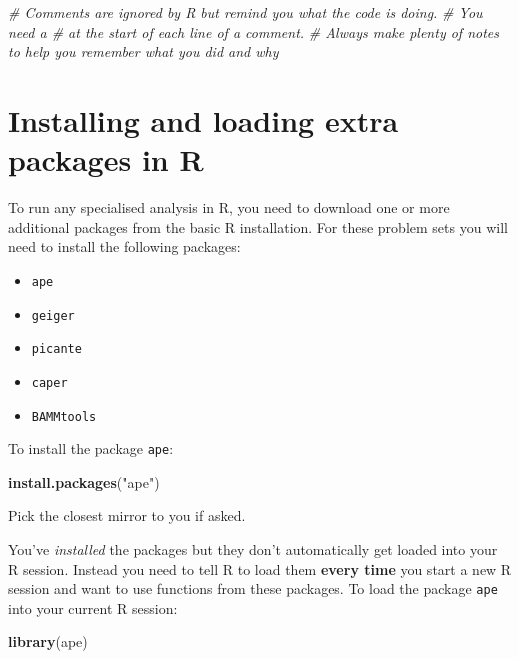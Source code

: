 \documentclass[]{book}
\newenvironment{Shaded}{\begin{snugshade}}{\end{snugshade}}
\newcommand{\KeywordTok}[1]{\textcolor[rgb]{0.13,0.29,0.53}{\textbf{{#1}}}}
\newcommand{\StringTok}[1]{\textcolor[rgb]{0.31,0.60,0.02}{{#1}}}
\newcommand{\CommentTok}[1]{\textcolor[rgb]{0.56,0.35,0.01}{\textit{{#1}}}}
\newcommand{\NormalTok}[1]{{#1}}
\providecommand{\tightlist}{%
  \setlength{\itemsep}{0pt}\setlength{\parskip}{0pt}}
\begin{document}
\begin{Shaded}
\begin{Highlighting}[]
\CommentTok{# Comments are ignored by R but remind you what the code is doing. }
\CommentTok{# You need a # at the start of each line of a comment.}
\CommentTok{# Always make plenty of notes to help you remember what you did and why}
\end{Highlighting}
\end{Shaded}

\section{Installing and loading extra packages in
R}\label{installing-and-loading-extra-packages-in-r}

To run any specialised analysis in R, you need to download one or more
additional packages from the basic R installation. For these problem
sets you will need to install the following packages:

\begin{itemize}
\tightlist
\item
  \texttt{ape}
\item
  \texttt{geiger}
\item
  \texttt{picante}
\item
  \texttt{caper}
\item
  \texttt{BAMMtools}
\end{itemize}

To install the package \texttt{ape}:

\begin{Shaded}
\begin{Highlighting}[]
\KeywordTok{install.packages}\NormalTok{(}\StringTok{"ape"}\NormalTok{)}
\end{Highlighting}
\end{Shaded}

Pick the closest mirror to you if asked.

You've \emph{installed} the packages but they don't automatically get
loaded into your R session. Instead you need to tell R to load them
\textbf{every time} you start a new R session and want to use functions
from these packages. To load the package \texttt{ape} into your current
R session:

\begin{Shaded}
\begin{Highlighting}[]
\KeywordTok{library}\NormalTok{(ape)}
\end{Highlighting}
\end{Shaded}
\end{document}

